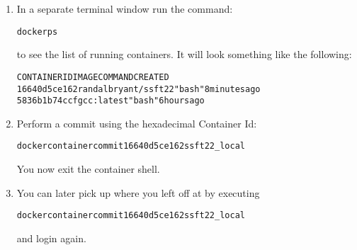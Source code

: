 \documentclass[12pt]{article}
\newenvironment{code}{\begin{alltt}\small}{\end{alltt}}
\begin{document}
\begin{enumerate}
\item In a separate terminal window run the command:
  \begin{code}
docker ps
  \end{code}
  to see the list of running containers.  It will look something like the following:
\begin{code}
CONTAINER ID   IMAGE                 COMMAND   CREATED
16640d5ce162   randalbryant/ssft22   "bash"    8 minutes ago
5836b1b74ccf   gcc:latest            "bash"    6 hours ago 
\end{code}

\item Perform a commit using the hexadecimal Container Id:
\begin{code}
docker container commit 16640d5ce162 ssft22_local
\end{code}
You now exit the container shell.

\item You can later pick up where you left off at by executing
\begin{code}
docker container commit 16640d5ce162 ssft22_local
\end{code}
and login again.
\end{enumerate}
\end{document}
